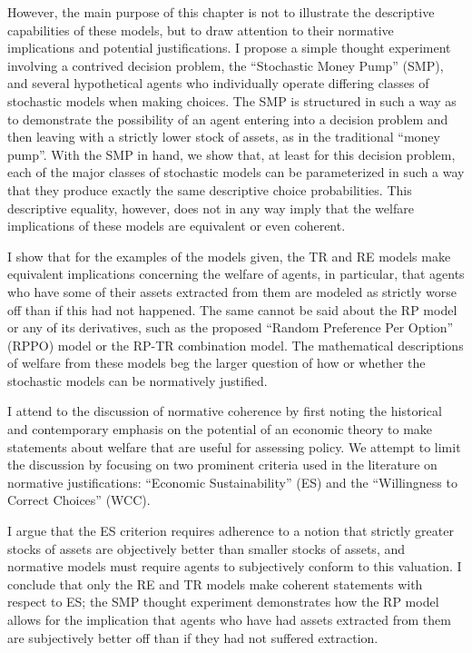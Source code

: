 \documentclass[../main.tex]{subfiles}
\begin{document}
However, the main purpose of this chapter is not to illustrate the descriptive capabilities of these models, but to draw attention to their normative implications and potential justifications.
I propose a simple thought experiment involving a contrived decision problem, the \enquote{Stochastic Money Pump} (SMP), and several hypothetical agents who individually operate differing classes of stochastic models when making choices.
The SMP is structured in such a way as to demonstrate the possibility of an agent entering into a decision problem and then leaving with a strictly lower stock of assets, as in the traditional \enquote{money pump}.
With the SMP in hand, we show that, at least for this decision problem, each of the major classes of stochastic models can be parameterized in such a way that they produce exactly the same descriptive choice probabilities.
This descriptive equality, however, does not in any way imply that the welfare implications of these models are equivalent or even coherent.

I show that for the examples of the models given, the TR and RE models make equivalent implications concerning the welfare of agents, in particular, that agents who have some of their assets extracted from them are modeled as strictly worse off than if this had not happened.
The same cannot be said about the RP model or any of its derivatives, such as the proposed \enquote{Random Preference Per Option} (RPPO) model or the RP-TR combination model.
The mathematical descriptions of welfare from these models beg the larger question of how or whether the stochastic models can be normatively justified.

I attend to the discussion of normative coherence by first noting the historical and contemporary emphasis on the potential of an economic theory to make statements about welfare that are useful for assessing policy.
We attempt to limit the discussion by focusing on two prominent criteria used in the literature on normative justifications: \enquote{Economic Sustainability} (ES) and the \enquote{Willingness to Correct Choices} (WCC).

I argue that the ES criterion requires adherence to a notion that strictly greater stocks of assets are objectively better than smaller stocks of assets, and normative models must require agents to subjectively conform to this valuation.
I conclude that only the RE and TR models make coherent statements with respect to ES; the SMP thought experiment demonstrates how the RP model allows for the implication that agents who have had assets extracted from them are subjectively better off than if they had not suffered extraction.
\end{document}
